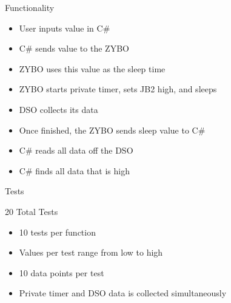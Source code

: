 \documentclass[pdf]{beamer}
\begin{document}
\begin{frame}{Functionality}

  \pause

  \begin{itemize}
  \item User inputs value in C\#
  \item C\# sends value to the ZYBO
  \end{itemize}

  \pause

  \begin{itemize}
  \item ZYBO uses this value as the sleep time
  \item ZYBO starts private timer, sets JB2 high, and sleeps
  \item DSO collects its data
  \end{itemize}

  \pause

  \begin{itemize}
  \item Once finished, the ZYBO sends sleep value to C\#
  \item C\# reads all data off the DSO
  \item C\# finds all data that is high
  \end{itemize}

\end{frame}

\begin{frame}{Tests}

  20 Total Tests
  \begin{itemize}
  \item 10 tests per function
  \item Values per test range from low to high
  \item 10 data points per test
  \item Private timer and DSO data is collected simultaneously
  \end{itemize}

\end{frame}
\end{document}

